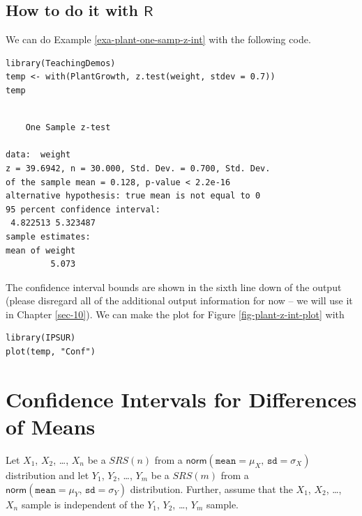 \documentclass[captions=tableheading]{scrbook}
\begin{document}
\subsection{How to do it with \(\mathsf{R}\)}
\label{sec-9-2-1}

We can do Example \ref{exa-plant-one-samp-z-int} with the following code.



\begin{verbatim}
library(TeachingDemos)
temp <- with(PlantGrowth, z.test(weight, stdev = 0.7))
temp
\end{verbatim}


\begin{verbatim}
 
	One Sample z-test

data:  weight 
z = 39.6942, n = 30.000, Std. Dev. = 0.700, Std. Dev.
of the sample mean = 0.128, p-value < 2.2e-16
alternative hypothesis: true mean is not equal to 0 
95 percent confidence interval:
 4.822513 5.323487 
sample estimates:
mean of weight 
         5.073
\end{verbatim}

The confidence interval bounds are shown in the sixth line down of the output (please disregard all of the additional output information for now -- we will use it in Chapter \ref{sec-10}). We can make the plot for Figure \ref{fig-plant-z-int-plot} with


\begin{verbatim}
library(IPSUR)
plot(temp, "Conf")
\end{verbatim}
\section{Confidence Intervals for Differences of Means}
\label{sec-9-3}
\label{sec-Conf-Interv-for-Diff-Means}


Let \(X_{1}\), \(X_{2}\), \ldots{}, \(X_{n}\) be a \(SRS(n)\) from a \(\mathsf{norm}(\mathtt{mean}=\mu_{X},\,\mathtt{sd}=\sigma_{X})\) distribution and let \(Y_{1}\), \(Y_{2}\), \ldots{}, \(Y_{m}\) be a \(SRS(m)\) from a \(\mathsf{norm}(\mathtt{mean}=\mu_{Y},\,\mathtt{sd}=\sigma_{Y})\) distribution. Further, assume that the \(X_{1}\), \(X_{2}\), \ldots{}, \(X_{n}\) sample is independent of the \(Y_{1}\), \(Y_{2}\), \ldots{}, \(Y_{m}\) sample.
\end{document}
